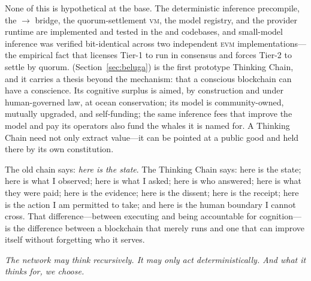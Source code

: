 None of this is hypothetical at the base. The deterministic inference precompile, the \CChain{}$\to$\AChain{} bridge, the quorum-settlement \textsc{vm}, the model registry, and the provider runtime are implemented and tested in the \Lux{} and \Hanzo{} codebases, and small-model inference was verified bit-identical across two independent \textsc{evm} implementations---the empirical fact that licenses Tier-1 to run in consensus and forces Tier-2 to settle by quorum. \Beluga{} (Section~\ref{sec:beluga}) is the first prototype Thinking Chain, and it carries a thesis beyond the mechanism: that a conscious blockchain can have a conscience. Its cognitive surplus is aimed, by construction and under human-governed law, at ocean conservation; its model is community-owned, mutually upgraded, and self-funding; the same inference fees that improve the model and pay its operators also fund the whales it is named for. A Thinking Chain need not only extract value---it can be pointed at a public good and held there by its own constitution.

The old chain says: \emph{here is the state}. The Thinking Chain says: here is the state; here is what I observed; here is what I asked; here is who answered; here is what they were paid; here is the evidence; here is the dissent; here is the receipt; here is the action I am permitted to take; and here is the human boundary I cannot cross. That difference---between executing and being accountable for cognition---is the difference between a blockchain that merely runs and one that can improve itself without forgetting who it serves.

\vspace{1em}
\noindent\emph{The network may think recursively. It may only act deterministically. And what it thinks for, we choose.}


